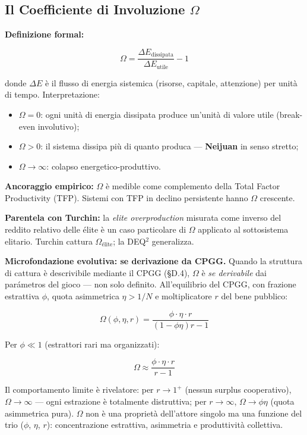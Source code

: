 \subsection{\texorpdfstring{Il Coefficiente di Involuzione
\(\Omega\)}{Il Coefficiente di Involuzione \textbackslash Omega}}\label{il-coefficiente-di-involución-omega}

\Proved{} \textbf{Definizione formal:}

\[
\Omega = \frac{\Delta E_{\text{dissipata}}}{\Delta E_{\text{utile}}} - 1
\]

donde \(\Delta E\) è il flusso di energia sistemica (risorse, capitale,
attenzione) per unità di tempo. Interpretazione:

\begin{itemize}
\tightlist
\item
  \(\Omega = 0\): ogni unità di energia dissipata produce un'unità di
  valore utile (break-even involutivo);
\item
  \(\Omega > 0\): il sistema dissipa più di quanto produca ---
  \textbf{Neijuan} in senso stretto;
\item
  \(\Omega \to \infty\): colapso energetico-produttivo.
\end{itemize}

\Hypoth{} \textbf{Ancoraggio empirico:} \(\Omega\) è medible come
complemento della Total Factor Productivity (TFP). Sistemi con TFP in
declino persistente hanno \(\Omega\) crescente.

\Hypoth{} \textbf{Parentela con Turchin:} la \emph{elite overproduction}
misurata come inverso del reddito relativo delle élite è un caso
particolare di \(\Omega\) applicato al sottosistema elitario. Turchin
cattura \(\Omega_{\text{élite}}\); la DEQ$^2$ generalizza.

\Proved{} \textbf{Microfondazione evolutiva: se derivazione da CPGG.}
Quando la struttura di cattura è descrivibile mediante il CPGG
(§D.4), \(\Omega\) è \emph{se derivabile} dai parámetros del gioco ---
non solo definito. All'equilibrio del CPGG, con frazione estrattiva
\(\phi\), quota asimmetrica \(\eta > 1/N\) e moltiplicatore \(r\) del
bene pubblico:

\[
\Omega(\phi,\eta,r) = \frac{\phi\cdot\eta\cdot r}{(1-\phi\eta)r - 1}
\]

Per \(\phi \ll 1\) (estrattori rari ma organizzati):

\[
\boxed{\Omega \approx \frac{\phi\cdot\eta\cdot r}{r-1}} \tag{P4}
\]

Il comportamento limite è rivelatore: per \(r \to 1^+\) (nessun
surplus cooperativo), \(\Omega \to \infty\) --- ogni estrazione è
totalmente distruttiva; per \(r \to \infty\), \(\Omega \to \phi\eta\)
(quota asimmetrica pura). \(\Omega\) non è una proprietà dell'attore
singolo ma una funzione del trio (\(\phi\), \(\eta\), \(r\)):
concentrazione estrattiva, asimmetria e produttività collettiva.



